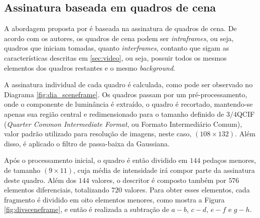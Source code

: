 

 

%
%

\subsection{Assinatura baseada em quadros de cena}

  A abordagem proposta por \citeauthor{mao2015sceneframe} é baseada na assinatura de quadros de cena. De acordo com os autores, os quadros de cena podem ser \textit{intraframes}, ou seja, quadros que iniciam tomadas, quanto \textit{interframes}, contanto que sigam as características descritas em \ref{sec:video}, ou seja, possuir todos os mesmos elementos dos quadros restantes e o mesmo \textit{background}.

A assinatura individual de cada quadro é calculada, como pode ser observado no Diagrama \ref{fig:dia_sceneframe}. Os quadros passam por um pré-processamento, onde o componente de luminância é extraído, o quadro é recortado, mantendo-se apenas sua região central e redimensionado para o tamanho definido de $3/4$QCIF (\textit{Quarter Common Intermediate Format}, ou Formato Intermediário Comum), valor padrão utilizado para resolução de imagens, neste caso, $(108\times132)$. Além disso, é aplicado o filtro de passa-baixa da Gaussiana.

Após o processamento inicial, o quadro é então dividido em $144$ pedaços menores, de tamanho $(9\times11)$, cuja média de intensidade irá compor parte da assinatura deste quadro. Além dos $144$ valores, o descritor é composto também por $576$ elementos diferenciais, totalizando $720$ valores. Para obter esses elementos, cada fragmento é dividido em oito elementos menores, como mostra a Figura \ref{fig:divsceneframe}, e então é realizada a subtração de $a - b$, $c - d$, $e - f$ e $g - h$.

